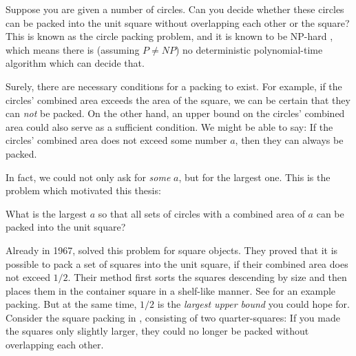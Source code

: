 \documentclass[a4paper,style=print,oneside,bibliography=totoc,nexus,lnum,extramargin]{tubsbook}
\begin{document}
Suppose you are given a number of circles. Can you decide whether these circles can be packed into the unit square without overlapping each other or the square? This is known as the circle packing problem, and it is known to be NP-hard \cite{DFL2010circle}, which means there is (assuming $P \ne NP$) no deterministic polynomial-time algorithm which can decide that.


Surely, there are necessary conditions for a packing to exist. For example, if the circles' combined area exceeds the area of the square, we can be certain that they can \emph{not} be packed.
On the other hand, an upper bound on the circles' combined area could also serve as a sufficient condition. We might be able to say: If the circles' combined area does not exceed some number $a$, then they can always be packed.

In fact, we could not only ask for \emph{some} $a$, but for the largest one. This is the problem which motivated this thesis:

\begin{problem}\label{prb:1}
    What is the largest $a$ so that all sets of circles with a combined area of $a$ can be packed into the unit square?
\end{problem}

Already in 1967, \textcite{MM1967some} solved this problem for square objects. They proved that it is possible to pack a set of squares into the unit square, if their combined area does not exceed $1/2$. Their method first sorts the squares descending by size and then places them in the container square in a shelf-like manner. See  for an example packing. But at the same time, $1/2$ is the \emph{largest upper bound} you could hope for. Consider the square packing in , consisting of two quarter-squares: If you made the squares only slightly larger, they could no longer be packed without overlapping each other.

\end{document}
